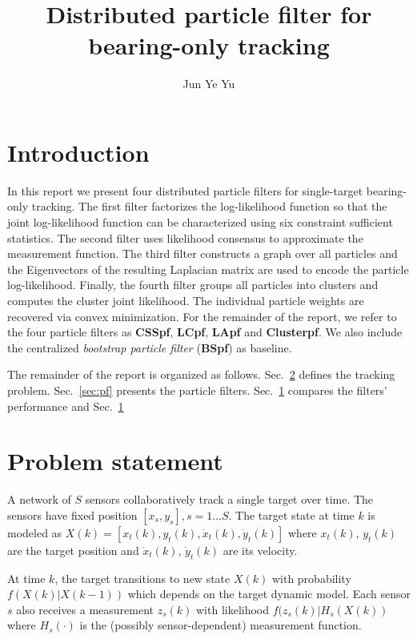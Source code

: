 \documentclass[10pt,letterpaper,final]{article}
\author{Jun Ye Yu}
\title{Distributed particle filter for bearing-only tracking}
\begin{document}
\maketitle

\section{Introduction}
In this report we present four distributed particle filters for single-target bearing-only tracking. The first filter factorizes the log-likelihood function so that the joint log-likelihood function can be characterized using six constraint sufficient statistics. The second filter uses likelihood consensus to approximate the measurement function. The third filter constructs a graph over all particles and the Eigenvectors of the resulting Laplacian matrix are used to encode the particle log-likelihood. Finally, the fourth filter groups all particles into clusters and computes the cluster joint likelihood. The individual particle weights are recovered via convex minimization. For the remainder of the report, we refer to the four particle filters as \textbf{CSSpf}, \textbf{LCpf}, \textbf{LApf} and \textbf{Clusterpf}. We also include the centralized \textit{bootstrap particle filter} (\textbf{BSpf}) as baseline. 

The remainder of the report is organized as follows. Sec.~\ref{sec:problem} defines the tracking problem. Sec.~\ref{sec:pf} presents the particle filters. Sec.~\ref{} compares the filters' performance and Sec.~\ref{}

\section{Problem statement}
\label{sec:problem}
A network of $S$ sensors collaboratively track a single target over time. The sensors have fixed position $[x_s, y_s], s=1...S$. The target state at time $k$ is modeled as $X(k) = [x_t(k),y_t(k), \dot{x}_t(k), \dot{y}_t(k)]$ where $x_t(k)$, $y_t(k)$ are the target position and $\dot{x}_t(k)$, $\dot{y}_t(k)$ are its velocity. 

At time $k$, the target transitions to new state $X(k)$ with probability $f(X(k)|X(k-1))$ which depends on the target dynamic model. Each sensor $s$ also receives a measurement $z_s(k)$ with likelihood $f(z_s(k)|H_s(X(k))$ where $H_s(\cdot)$ is the (possibly sensor-dependent) measurement function. 
\end{document}
